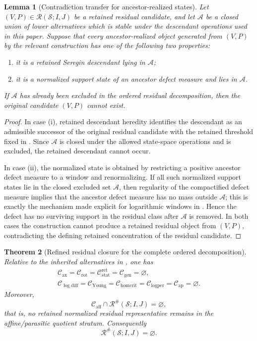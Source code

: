 \documentclass[11pt]{amsart}
\numberwithin{equation}{section}
\theoremstyle{plain}
\newtheorem{theorem}{Theorem}[section]
\newtheorem{lemma}[theorem]{Lemma}
\theoremstyle{definition}
\theoremstyle{remark}
\newcommand{\calS}{\mathcal S}
\newcommand{\calR}{\mathcal R}
\newcommand{\Cax}{\mathcal C_{\mathrm{ax}}}
\newcommand{\Crot}{\mathcal C_{\mathrm{rot}}}
\newcommand{\Cstat}{\mathcal C_{\mathrm{stat}}^{\mathrm{ret}}}
\newcommand{\Caff}{\mathcal C_{\mathrm{aff}}}
\newcommand{\Cgen}{\mathcal C_{\mathrm{gen}}}
\newcommand{\Chomcrit}{\mathcal C_{\mathrm{homcrit}}}
\newcommand{\Clogper}{\mathcal C_{\mathrm{logper}}}
\newcommand{\Capcrit}{\mathcal C_{\mathrm{ap}}}
\newcommand{\Cyoung}{\mathcal C_{\mathrm{Young}}}
\newcommand{\Clogdiff}{\mathcal C_{\log\mathrm{diff}}}
\begin{document}
\begin{lemma}[Contradiction transfer for ancestor-realized states]
\label{lem:ancestor-contradiction-transfer}
Let \((V,P)\in\calR(\calS;I,J)\) be a retained residual candidate, and let
\(\mathcal A\) be a closed union of lower alternatives which is stable under
the descendant operations used in this paper.  Suppose that every
ancestor-realized object generated from \((V,P)\) by the relevant construction
has one of the following two properties:
\begin{enumerate}[label=\textup{(\roman*)}]
   \item it is a retained Seregin descendant lying in \(\mathcal A\);
   \item it is a normalized support state of an ancestor defect measure and lies
   in \(\mathcal A\).
\end{enumerate}
If \(\mathcal A\) has already been excluded in the ordered residual
decomposition, then the original candidate \((V,P)\) cannot exist.
\end{lemma}

\begin{proof}
In case \textup{(i)}, retained descendant heredity
 identifies the descendant as an admissible
successor of the original residual candidate with the retained threshold fixed
in .  Since \(\mathcal A\) is closed under the
allowed state-space operations and is excluded, the retained descendant cannot
occur.

In case \textup{(ii)}, the normalized state is obtained by restricting a
positive ancestor defect measure to a window and renormalizing.  If all such
normalized support states lie in the closed excluded set \(\mathcal A\), then
regularity of the compactified defect measure implies that the ancestor defect
measure has no mass outside \(\mathcal A\); this is exactly the mechanism made
explicit for logarithmic windows in
.  Hence the defect has no surviving
support in the residual class after \(\mathcal A\) is removed.  In both cases
the construction cannot produce a retained residual object from \((V,P)\),
contradicting the defining retained concentration of the residual candidate.
\end{proof}

\begin{theorem}[Refined residual closure for the complete ordered decomposition]
\label{thm:refined-residual-closure}
\label{thm:refined-residual-closure-complete-decomposition}
Relative to the inherited alternatives in
, one has
\[
\begin{gathered}
   \Cax=\Crot=\Cstat=\Cgen=\varnothing,\\
   \Clogdiff=\Cyoung=\Chomcrit=\Clogper=\Capcrit=\varnothing .
\end{gathered}
\]
Moreover,
\[
   \Caff\cap\calR^\#(\calS;I,J)=\varnothing ,
\]
that is, no retained normalized residual representative remains in the
affine/parasitic quotient stratum.  Consequently
\[
   \calR^\#(\calS;I,J)=\varnothing .
\]
\end{theorem}
\end{document}
